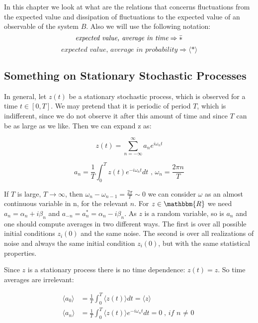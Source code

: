 \documentclass{article}
\begin{document}
In this chapter we look at what are the relations that concerns fluctuations from the expected value and dissipation of fluctuations to the expected value of an observable of the system $B$. Also we will use the following notation:
$$ \textit{expected value, average in time} \Rightarrow \Bar{*}  $$
$$ \textit{expected value, average in probability} \Rightarrow \langle  * \rangle$$
\subsection{Something on Stationary Stochastic Processes}

In general, let $z(t)$ be a stationary stochastic process, which is observed for a time $t \in [0,T]$. We may pretend that it is periodic of period $T$, which is indifferent, since we do not observe it after this amount of time and since $T$ can be as large as we like. Then we can expand z as:

\begin{equation}
z(t) = \sum_{n = - \infty}^{ \infty} a_n e^{i \omega_n t}
\end{equation}


\begin{equation}
a_n = \frac{1}{T} \int_{0}^{T} z(t) e^{-i \omega_n t} dt \textit{  ,  } \omega_n = \frac{2 \pi n}{T}
\end{equation}

If $T$ is large, $T \to \infty$, then $\omega_n - \omega_{n-1} = \frac{2 \pi}{ T } \sim 0$ we can consider $\omega$ as an almost continuous variable in n, for the relevant $n$. For $z \in \mathbbm{R}$ we need $a_n = \alpha_n + i \beta_n$ and $a_{-n} = a_n^*=\alpha_n-i\beta_n$. As $z$ is a random variable, so is $a_n$ and one should compute averages in two different ways. The first is over all possible initial conditions $z_i(0)$ and the same noise. The second is over all realizations of noise and always the same initial condition $z_i(0)$, but with the same statistical properties.

Since $z$ is a stationary process there is no time dependence: $z(t) = z$. So time averages are irrelevant:

\begin{align*}
   \langle a_0 \rangle &= \frac{1}{T} \int_{0}^{T} \langle z(t) \rangle dt = \langle z \rangle \\
\langle a_n \rangle &= \frac{1}{T} \int_{0}^{T} \langle z(t) \rangle e^{-i \omega_n t}dt = 0 \textit{, if n $\ne$ 0}  
\end{align*}
$$$$
\end{document}
